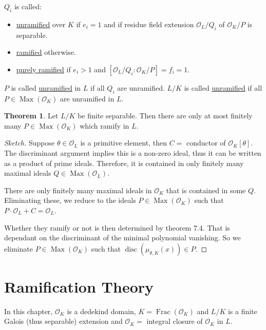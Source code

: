 \documentclass[openany]{amsbook}
\numberwithin{section}{chapter}
\theoremstyle{definition}
\newtheorem{theorem}{Theorem}[chapter]
\newcommand{\Frac}{\operatorname{Frac}}
\begin{document}
\(Q_i\) is called:

\begin{itemize}
    \item \underline{unramified} over \(K\) if \(e_i = 1\) and if residue field extension \(\mathcal{O}_L / Q_i\) of \(\mathcal{O}_K / P\) is separable.
    \item \underline{ramified} otherwise.
    \item \underline{purely ramified} if \(e_i > 1\) and \([\mathcal{O}_L / Q_i : \mathcal{O}_K / P]=f_i = 1\). 
\end{itemize} 

\(P\) is called \underline{unramified} in \(L\) if all \(Q_i\) are unramified. \(L / K\) is called \underline{unramified} if all \(P \in \operatorname{Max}(\mathcal{O}_K)\) are unramified in \(L\).

\begin{theorem}
    Let \(L / K\) be finite separable. Then there are only at most finitely many \(P\in \operatorname{Max}(\mathcal{O}_K)\) which ramify in \(L\).
\end{theorem}

\begin{proof}
    [Sketch] Suppose \(\theta \in \mathcal{O}_L\) is a primitive element, then \(C =\) conductor of \(\mathcal{O}_K[\theta]\). The discriminant argument implies this is a non-zero ideal, thus it can be written as a product of prime ideals. Therefore, it is contained in only finitely many maximal ideals \(Q \in \operatorname{Max}(\mathcal{O}_L)\).
    
    There are only finitely many maximal ideals in \(\mathcal{O}_K\) that is contained in some \(Q\). Eliminating these, we reduce to the ideals \(P\in \operatorname{Max} (\mathcal{O}_K)\) such that \(P\cdot \mathcal{O}_L + C = \mathcal{O}_L\).

    Whether they ramify or not is then determined by theorem 7.4. That is dependant on the discriminant of the minimal polynomial vanishing. So we eliminate \(P\in \operatorname{Max}(\mathcal{O}_K)\) such that \(\operatorname{disc}(\mu_{\theta , K}(x))\in P\).
\end{proof}

\chapter{Ramification Theory}

In this chapter, \(\mathcal{O}_K\) is a dedekind domain, \(K = \Frac(\mathcal{O}_K)\) and \(L / K\) is a finite Galois (thus separable) extension and \(\mathcal{O}_K =\) integral closure of \(\mathcal{O}_K\) in \(L\).
\end{document}
